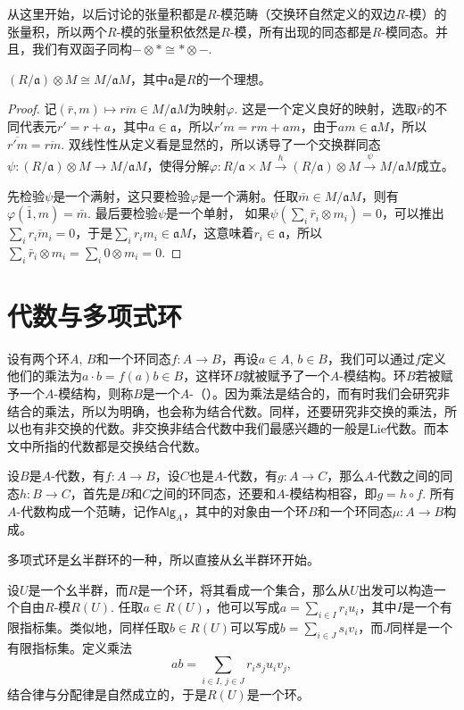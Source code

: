 从这里开始，以后讨论的张量积都是$R$-模范畴（交换环自然定义的双边$R$-模）的张量积，所以两个$R$-模的张量积依然是$R$-模，所有出现的同态都是$R$-模同态。并且，我们有双函子同构$-\otimes *\cong *\otimes -$.

\begin{pro}
$(R/\mathfrak{a})\otimes M\cong M/\mathfrak{a}M$，其中$\mathfrak{a}$是$R$的一个理想。
\end{pro}

\begin{proof}
	记$(\bar{r},m)\mapsto \overline{rm}\in M/\mathfrak{a}M$为映射$\varphi$. 这是一个定义良好的映射，选取$\bar{r}$的不同代表元$r'=r+a$，其中$a\in\mathfrak{a}$，所以$r'm=rm+am$，由于$am\in \mathfrak{a}M$，所以$\overline{r'm}=\overline{rm}$. 双线性性从定义看是显然的，所以诱导了一个交换群同态$\psi:(R/\mathfrak{a})\otimes M\to M/\mathfrak{a}M$，使得分解$\varphi:R/\mathfrak{a}\times M\xrightarrow{h} (R/\mathfrak{a})\otimes M\xrightarrow{\psi} M/\mathfrak{a}M$成立。

	先检验$\psi$是一个满射，这只要检验$\varphi$是一个满射。任取$\bar{m}\in M/\mathfrak{a}M$，则有$\varphi(\bar{1},m)=\bar{m}$. 最后要检验$\psi$是一个单射，
	如果$\psi(\sum_i \bar{r}_i\otimes m_i)=0$，可以推出$\sum_i \overline{r_im_i}=0$，于是$\sum_i r_im_i \in \mathfrak{a}M$，这意味着$r_i\in \mathfrak{a}$，所以$\sum_i \bar{r}_i\otimes m_i=\sum_i 0\otimes m_i=0$.
\end{proof}

\section{代数与多项式环}

设有两个环$A$, $B$和一个环同态$f:A\to B$，再设$a\in A$, $b\in B$，我们可以通过$f$定义他们的乘法为$a\cdot b=f(a)b\in B$，这样环$B$就被赋予了一个$A$-模结构。环$B$若被赋予一个$A$-模结构，则称$B$是一个$A$-（）。因为乘法是结合的，而有时我们会研究非结合的乘法，所以为明确，也会称为结合代数。同样，还要研究非交换的乘法，所以也有非交换的代数。非交换非结合代数中我们最感兴趣的一般是Lie代数。而本文中所指的代数都是交换结合代数。

设$B$是$A$-代数，有$f:A\to B$，设$C$也是$A$-代数，有$g:A\to C$，那么$A$-代数之间的同态$h:B\to C$，首先是$B$和$C$之间的环同态，还要和$A$-模结构相容，即$g=h\circ f$. 所有$A$-代数构成一个范畴，记作$\mathsf{Alg}_A$，其中的对象由一个环$B$和一个环同态$\mu:A\to B$构成。

多项式环是幺半群环的一种，所以直接从幺半群环开始。

\para 设$U$是一个幺半群，而$R$是一个环，将其看成一个集合，那么从$U$出发可以构造一个自由$R$-模$R(U)$. 任取$a\in R(U)$，他可以写成$a=\sum_{i\in I} r_i u_i$，其中$I$是一个有限指标集。类似地，同样任取$b\in R(U)$可以写成$b=\sum_{i\in J} s_i v_i$，而$J$同样是一个有限指标集。定义乘法
\[
	ab=\sum_{i\in I,\, j\in J}r_is_j u_i v_j,
\]
结合律与分配律是自然成立的，于是$R(U)$是一个环。

